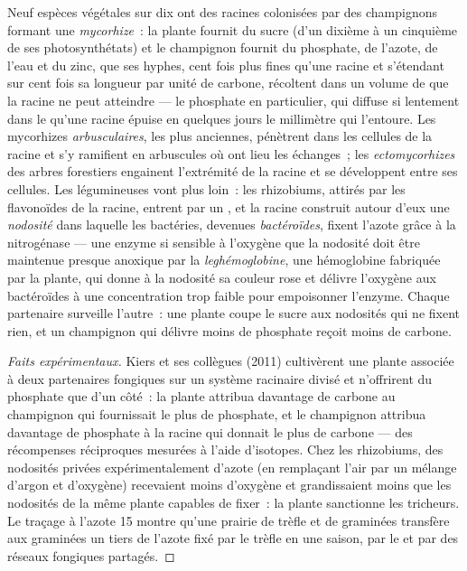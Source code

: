 \begin{proposition}\label{prop:b2:living-soil:symbiosis}
Neuf espèces végétales sur dix ont des racines colonisées par des
champignons formant une
\emph{mycorhize}~: la plante fournit du sucre (d'un dixième à un
cinquième de ses photosynthétats) et le champignon fournit du phosphate,
de l'azote, de l'eau et du zinc, que ses hyphes, cent fois plus fines
qu'une racine et s'étendant sur cent fois sa longueur par unité de
carbone, récoltent dans un volume de  que la racine ne peut atteindre
--- le phosphate en particulier, qui diffuse si lentement dans le 
qu'une racine épuise en quelques jours le millimètre qui l'entoure.
Les mycorhizes \emph{arbusculaires}, les plus anciennes, pénètrent dans
les cellules de la racine et s'y ramifient en arbuscules où ont lieu les
échanges~; les \emph{ectomycorhizes} des arbres forestiers engainent
l'extrémité de la racine et se développent entre ses cellules. Les
légumineuses vont plus loin~: les rhizobiums, attirés par les flavonoïdes
de la racine, entrent par un , et la racine construit
autour d'eux une \emph{nodosité} dans laquelle les bactéries, devenues
\emph{bactéroïdes}, fixent l'azote grâce à la nitrogénase --- une enzyme
si sensible à l'oxygène que la nodosité doit être maintenue presque
anoxique par la
\emph{leghémoglobine}, une hémoglobine fabriquée par la plante, qui donne
à la nodosité sa couleur rose et délivre l'oxygène aux bactéroïdes à une
concentration trop faible pour empoisonner l'enzyme. Chaque partenaire
surveille l'autre~: une plante coupe le sucre aux nodosités qui ne fixent
rien, et un champignon qui délivre moins de phosphate reçoit moins de
carbone.
\end{proposition}
\begin{proof}[Faits expérimentaux]
Kiers et ses collègues (2011) cultivèrent une plante associée à deux
partenaires fongiques sur un système racinaire divisé et n'offrirent du
phosphate que d'un côté~: la plante attribua davantage de carbone au
champignon qui fournissait le plus de phosphate, et le champignon
attribua davantage de phosphate à la racine qui donnait le plus de
carbone --- des récompenses réciproques mesurées à l'aide d'isotopes.
Chez les rhizobiums, des nodosités privées expérimentalement d'azote (en
remplaçant l'air par un mélange d'argon et d'oxygène) recevaient moins
d'oxygène et grandissaient moins que les nodosités de la même plante
capables de fixer~: la plante sanctionne les tricheurs. Le traçage à
l'azote 15 montre qu'une prairie de trèfle et de graminées transfère aux
graminées un tiers de l'azote fixé par le trèfle en une saison, par le
 et par des réseaux fongiques partagés.
\end{proof}


